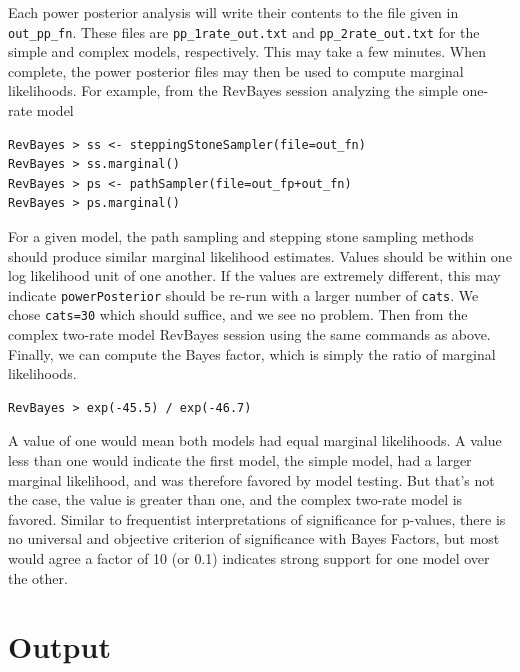 \documentclass[11pt]{article}
\begin{document}
Each power posterior analysis will write their contents to the file given in {\tt out\_pp\_fn}.
These files are {\tt pp\_1rate\_out.txt} and {\tt pp\_2rate\_out.txt} for the simple and complex models, respectively.
This may take a few minutes.
When complete, the power posterior files may then be used to compute marginal likelihoods.
For example, from the RevBayes session analyzing the simple one-rate model

\begin{snugshade}
\begin{lstlisting}
RevBayes > ss <- steppingStoneSampler(file=out_fn)
RevBayes > ss.marginal() 
RevBayes > ps <- pathSampler(file=out_fp+out_fn)
RevBayes > ps.marginal() 
\end{lstlisting}
\end{snugshade}

For a given model, the path sampling and stepping stone sampling methods should produce similar marginal likelihood estimates.
Values should be within one log likelihood unit of one another.
If the values are extremely different, this may indicate {\tt powerPosterior} should be re-run with a larger number of {\tt cats}.
We chose {\tt cats=30} which should suffice, and we see no problem.
Then from the complex two-rate model RevBayes session using the same commands as above.
Finally, we can compute the Bayes factor, which is simply the ratio of marginal likelihoods.

\begin{snugshade}
\begin{lstlisting}
RevBayes > exp(-45.5) / exp(-46.7)
\end{lstlisting}
\end{snugshade}

A value of one would mean both models had equal marginal likelihoods.
A value less than one would indicate the first model, the simple model, had a larger marginal likelihood, and was therefore favored by model testing.
But that's not the case, the value is greater than one, and the complex two-rate model is favored.
Similar to frequentist interpretations of significance for p-values, there is no universal and objective criterion of significance with Bayes Factors, but most would agree a factor of 10 (or 0.1) indicates strong support for one model over the other.

\section{Output}
\end{document}
